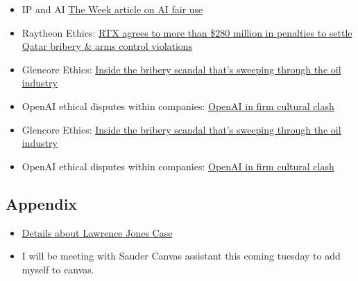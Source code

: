 \documentclass[
  11pt,
]{article}
\providecommand{\tightlist}{%
  \setlength{\itemsep}{0pt}\setlength{\parskip}{0pt}}
\begin{document}
\begin{itemize}
\tightlist
\item
  IP and AI
  \href{https://theweek.com/tech/ai-fair-use-copyrighted-media-trains-bots}{The
  Week article on AI fair use}
\item
  Raytheon Ethics:
  \href{https://www.wsj.com/articles/rtx-agrees-to-more-than-280-million-in-penalties-to-settle-qatar-bribery-arms-control-violations-7368bf98?gaa_at=eafs&gaa_n=ASWzDAiE1z_s4buplQHYLUrzC8wR7x8ZeyDpQfmuQ1jNPC2pP_Jlvzp55qq7&gaa_sig=iVMI5Rj_kpBXM3-jcEi7EpdJeDq0X_0rZKIZSXoRcXHd1lx16d508-WH2zXsQ0gzXTPNK5K8Jg6y84RgOOK_IQ\%3D\%3D&gaa_ts=688be7a3}{RTX
  agrees to more than \$280 million in penalties to settle Qatar bribery
  \& arms control violations}
\item
  Glencore Ethics:
  \href{https://www.wsj.com/articles/inside-the-bribery-scandal-thats-sweeping-through-the-oil-industry-1518543648?gaa_at=eafs&gaa_n=ASWzDAjonC0ZvhOArbiu8fQmhaoIAPVBIEzyrt6edgKhfrs68TM_sYuKhM5b&gaa_sig=QXWvAA2pGRTO0SMy3UziYWQM3VHC4AgG7DTH-45eimDi-Yb7zFq2Z069trhFEsfSzIxNZ985EXf6nfVzo_nRKg\%3D\%3D&gaa_ts=688be7a3}{Inside
  the bribery scandal that's sweeping through the oil industry}
\item
  OpenAI ethical disputes within companies:
  \href{https://archive.ph/rR3Gt\#selection-565.3-593.46}{OpenAI in firm
  cultural clash}
\item
  Glencore Ethics:
  \href{https://www.wsj.com/articles/inside-the-bribery-scandal-thats-sweeping-through-the-oil-industry-1518543648?gaa_at=eafs&gaa_n=ASWzDAjonC0ZvhOArbiu8fQmhaoIAPVBIEzyrt6edgKhfrs68TM_sYuKhM5b&gaa_sig=QXWvAA2pGRTO0SMy3UziYWQM3VHC4AgG7DTH-45eimDi-Yb7zFq2Z069trhFEsfSzIxNZ985EXf6nfVzo_nRKg\%3D\%3D&gaa_ts=688be7a3}{Inside
  the bribery scandal that's sweeping through the oil industry}
\item
  OpenAI ethical disputes within companies:
  \href{https://archive.ph/rR3Gt\#selection-565.3-593.46}{OpenAI in firm
  cultural clash}
\end{itemize}

\subsection{Appendix}\label{appendix}

\begin{itemize}
\tightlist
\item
  \href{https://www.youtube.com/watch?v=NJuogMaLva4}{Details about
  Lawrence Jones Case}
\item
  I will be meeting with Sauder Canvas assistant this coming tuesday to
  add myself to canvas.
\end{itemize}
\end{document}
